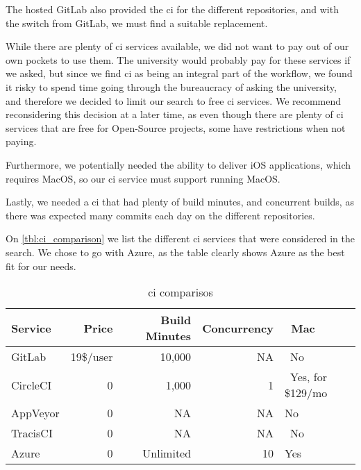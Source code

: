 The hosted GitLab also provided the \gls{ci} for the different repositories, and with the switch from GitLab, we must find a suitable replacement.

While there are plenty of \gls{ci} services available, we did not want to pay out of our own pockets to use them. The university would probably pay for these services if we asked, but since we find \gls{ci} as being an integral part of the workflow, we found it risky to spend time going through the bureaucracy of asking the university, and therefore we decided to limit our search to free \gls{ci} services. We recommend reconsidering this decision at a later time, as even though there are plenty of \gls{ci} services that are free for Open-Source projects, some have restrictions when not paying.

Furthermore, we potentially needed the ability to deliver iOS applications, which requires MacOS, so our \gls{ci} service must support running MacOS. 

Lastly, we needed a \gls{ci} that had plenty of build minutes, and concurrent builds, as there was expected many commits each day on the different repositories.

On \autoref{tbl:ci_comparison} we list the different \gls{ci} services that were considered in the search. We chose to go with Azure, as the table clearly shows Azure as the best fit for our needs.

\noindent\begin{longtable}[]{@{}lrrrl@{}}
    \caption{\gls{ci} comparisos}
    \label{tbl:ci_comparison}\\
    \toprule
    Service & Price & ~Build Minutes & Concurrency & ~Mac\tabularnewline
    \midrule
    \endhead
    GitLab & 19\$/user & 10,000 & NA & ~No\tabularnewline
    CircleCI & 0 & 1,000 & 1 & ~Yes, for \$129/mo\tabularnewline
    AppVeyor & 0 & ~ NA & NA & No\tabularnewline
    TracisCI & ~ 0 & ~ NA & ~ NA & ~No ~\tabularnewline
    Azure & 0 & ~ Unlimited & ~10 & Yes\tabularnewline
    \bottomrule
\end{longtable}
